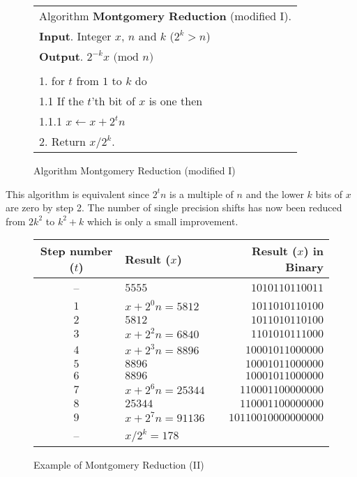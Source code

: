 \documentclass[b5paper]{book}
\begin{document}
\begin{figure}[!here]
\begin{small}
\begin{center}
\begin{tabular}{l}
\hline Algorithm \textbf{Montgomery Reduction} (modified I). \\
\textbf{Input}.   Integer $x$, $n$ and $k$ ($2^k > n$) \\
\textbf{Output}.  $2^{-k}x \mbox{ (mod }n\mbox{)}$ \\
\hline \\
1.  for $t$ from $1$ to $k$ do \\
\hspace{3mm}1.1  If the $t$'th bit of $x$ is one then \\
\hspace{6mm}1.1.1  $x \leftarrow x + 2^tn$ \\
2.  Return $x/2^k$. \\
\hline
\end{tabular}
\end{center}
\end{small}
\caption{Algorithm Montgomery Reduction (modified I)}
\end{figure}

This algorithm is equivalent since $2^tn$ is a multiple of $n$ and the lower $k$ bits of $x$ are zero by step 2.  The number of single
precision shifts has now been reduced from $2k^2$ to $k^2 + k$ which is only a small improvement.

\begin{figure}[here]
\begin{small}
\begin{center}
\begin{tabular}{|c|l|r|}
\hline \textbf{Step number ($t$)} & \textbf{Result ($x$)} & \textbf{Result ($x$) in Binary} \\
\hline -- & $5555$ & $1010110110011$ \\
\hline $1$ & $x + 2^{0}n = 5812$ &  $1011010110100$ \\
\hline $2$ & $5812$ & $1011010110100$ \\
\hline $3$ & $x + 2^{2}n = 6840$ & $1101010111000$ \\
\hline $4$ & $x + 2^{3}n = 8896$ & $10001011000000$ \\
\hline $5$ & $8896$ & $10001011000000$ \\
\hline $6$ & $8896$ & $10001011000000$ \\
\hline $7$ & $x + 2^{6}n = 25344$ & $110001100000000$ \\
\hline $8$ & $25344$ & $110001100000000$ \\
\hline $9$ & $x + 2^{7}n = 91136$ & $10110010000000000$ \\
\hline -- & $x/2^k = 178$ & \\
\hline
\end{tabular}
\end{center}
\end{small}
\caption{Example of Montgomery Reduction (II)}
\label{fig:MONT2}
\end{figure}
\end{document}

